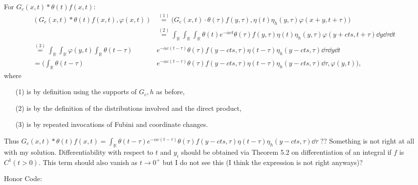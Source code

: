 \documentclass[11pt]{article}
\newcommand{\eq}[1]{\overset{(#1)}{=}}
\begin{document}
\begin{enumerate}
\begin{enumerate}[label=(\roman*)]
        For $G_c(x,t)\ast\theta(t)f(x,t)$: 
        \begin{align*}
            (G_c(x,t)\ast \theta(t)f(x,t),\varphi(x,t)) &\eq{1} \big(G_c(x,t)\cdot \theta(\tau)f(y,\tau), \eta(t)\eta_h(y,\tau)\varphi(x+y,t+\tau)\big) \\
            &\eq{2} \int_{\mathbb R}\int_{\mathbb R}\int_{\mathbb R}\theta(t)e^{-\alpha ct}\theta(\tau)f(y,\tau)\eta(t)\eta_h(y,\tau)\varphi(y+cts,t+\tau)\dd y\dd\tau\dd t\\
            \eq{3} \int_{\mathbb R}\int_{\mathbb R}\varphi(y,t)\int_{\mathbb R}\theta(t-\tau)&e^{-\alpha c(t-\tau)}\theta(\tau)f(y-cts,\tau)\eta(t-\tau)\eta_h(y-cts,\tau) \dd \tau \dd y \dd t\\
            = \bigg(\int_{\mathbb R}\theta(t-\tau)&e^{-\alpha c(t-\tau)}\theta(\tau)f(y-cts,\tau)\eta(t-\tau)\eta_h(y-cts,\tau) \dd \tau,\varphi(y,t)\bigg),
        \end{align*}where \begin{enumerate}
            \item[(1)] is by definition using the supports of $G_c,h$ as before,
            \item[(2)] is by the definition of the distributions involved and the direct product,
            \item[(3)] is by repeated invocations of Fubini and coordinate changes.
        \end{enumerate}
        Thus $G_c(x,t)\ast \theta(t)f(x,t) = \int_{\mathbb R}\theta(t-\tau)e^{-\alpha c(t-\tau)}\theta(\tau)f(y-cts,\tau)\eta(t-\tau)\eta_h(y-cts,\tau) \dd \tau$ ?? Something is not right at all with my solution. Differentiability with respect to $t$ and $y_i$ should be obtained via Theorem 5.2 on differentiation of an integral if $f$ is $C^1(t>0)$. This term should also vanish as $t\to 0^+$ but I do not see this (I think the expression is not right anyways)?
    \end{enumerate}

    \hrulefill
\end{enumerate}
Honor Code: \vspace*{7em}
\end{document}
